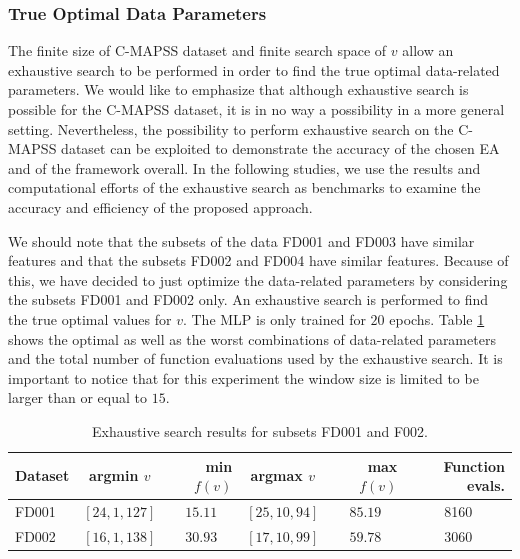 \documentclass[preprint,12pt]{elsarticle}%
\begin{document}
\subsubsection{True Optimal Data Parameters}

The finite size of C-MAPSS dataset and finite search space 
of $v$ allow an exhaustive
search to be performed in order to find the true optimal data-related
parameters. We would like to emphasize that although exhaustive search is possible for the C-MAPSS dataset, it is in no way a possibility in a more general
setting. Nevertheless, the possibility to perform exhaustive search on the
C-MAPSS dataset can be exploited to demonstrate the accuracy of the chosen EA
and of the framework overall. In the following studies, we use the results and
computational efforts of the exhaustive search as benchmarks to examine the
accuracy and efficiency of the proposed approach.

We should note that the subsets of the data FD001 and FD003 have similar
features and that the subsets FD002 and FD004 have similar features. Because
of this, we have decided to just optimize the data-related parameters by
considering the subsets FD001 and FD002 only. An exhaustive search is
performed to find the true optimal values for $v$. 
The MLP is only trained for $20$ epochs. Table
\ref{table:true_optimal_data_params} shows the optimal as well as the worst
combinations of data-related parameters and the total number of function
evaluations used by the exhaustive search. It is important to notice that for 
this experiment the window size is limited to be larger than or equal to $15$.

\begin{table}[!htb]
\begin{center}
\begin{tabular}
[c]{l|crcrr}\hline
Dataset & argmin $v$ & min $f(v)$ & argmax $v$ & max $f(v)$ & Function evals.\\\hline
FD001 & $\left[  24,1,127\right]  $ & \multicolumn{1}{c}{$15.11$} & $\left[25,10,94\right]  $ & \multicolumn{1}{c}{$85.19$} & \multicolumn{1}{c}{8160}\\
FD002 & $\left[  16,1,138\right]  $ & \multicolumn{1}{c}{$30.93$} & $\left[17,10,99\right]  $ & \multicolumn{1}{c}{$59.78$} & \multicolumn{1}{c}{3060}\\\hline
\end{tabular}
\caption{Exhaustive search results for subsets FD001 and F002.}
\label{table:true_optimal_data_params}
\end{center}
\end{table}
\end{document}
